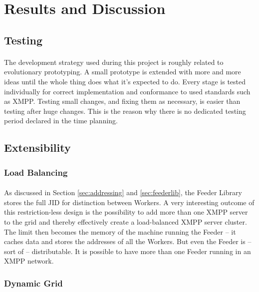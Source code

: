 \section{Results and Discussion}
\label{sec:discussion}

\subsection{Testing}
\label{sec:testing}
\paragraph{}
The development strategy used during this project is roughly related to evolutionary prototyping. A small prototype is extended with more and more ideas until the whole thing does what it's expected to do. Every stage is tested individually for correct implementation and conformance to used standards such as XMPP. Testing small changes, and fixing them as necessary, is easier than testing after huge changes. This is the reason why there is no dedicated testing period declared in the time planning.


\subsection{Extensibility}
\label{sec:extensibility}

\subsubsection{Load Balancing}
\paragraph{}
As discussed in Section \ref{sec:addressing} and \ref{sec:feederlib}, the Feeder Library stores the full JID for distinction between Workers. A very interesting outcome of this restriction-less design is the possibility to add more than one XMPP server to the grid and thereby effectively create a load-balanced XMPP server cluster. The limit then becomes the memory of the machine running the Feeder -- it caches data and stores the addresses of all the Workers. But even the Feeder is -- sort of -- distributable. It is possible to have more than one Feeder running in an XMPP network.

\subsubsection{Dynamic Grid}
